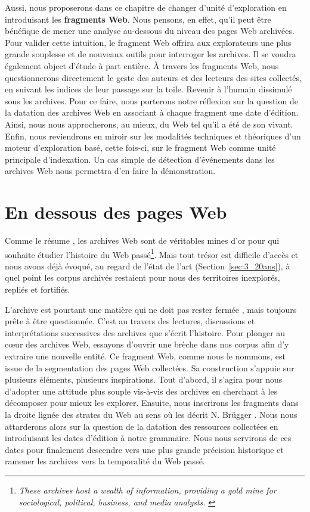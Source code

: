 \documentclass[symmetric,justified,marginals=raggedouter]{tufte-book}
\begin{document}
Aussi, nous proposerons dans ce chapitre de changer d'unité d'exploration en introduisant les \textbf{fragments Web}. Nous pensons, en effet, qu'il peut être bénéfique de mener une analyse au-dessous du niveau des pages Web archivées. Pour valider cette intuition, le fragment Web offrira aux explorateurs une plus grande souplesse et de nouveaux outils pour interroger les archives. Il se voudra également object d'étude à part entière. À travers les fragments Web, nous questionnerons directement le geste des auteurs et des lecteurs des sites collectés, en suivant les indices de leur passage sur la toile. Revenir à l'humain dissimulé sous les archives. Pour ce faire, nous porterons notre réflexion sur la question de la datation des archives Web en associant à chaque fragment une date d'édition. Ainsi, nous nous approcherons, au mieux, du Web tel qu'il a été de son vivant. Enfin, nous reviendrons en miroir sur les modalités techniques et théoriques d'un moteur d'exploration basé, cette fois-ci, sur le fragment Web comme unité principale d'indexation. Un cas simple de détection d'événements dans les archives Web nous permettra d'en faire la démonstration.

\section{En dessous des pages Web}
\label{sec:5_dessous}

\noindent Comme le résume \citep{weikum_longitudinal_2011}, les archives Web sont de véritables mines d'or pour qui souhaite étudier l'histoire du Web passé\footnote{\RaggedOuter \og\textit{These archives host a wealth of information, providing a gold mine for sociological, political, business, and media analysts.}\fg{} \citep{weikum_longitudinal_2011}}. Mais tout trésor est difficile d'accès et nous avons déjà évoqué, au regard de l'état de l'art (Section~\ref{sec:3_20ans}), à quel point les corpus archivés restaient pour nous des territoires inexplorés, repliés et fortifiés. 

L'archive est pourtant une matière qui ne doit pas rester fermée \citep{ketelaar_de_2006}, mais toujours prête à être questionnée. C'est au travers des lectures, discussions et interprétations successives des archives que s'écrit l'histoire. Pour plonger au cœur des archives Web, essayons d'ouvrir une brèche dans nos corpus afin d'y extraire une nouvelle entité. Ce fragment Web, comme nous le nommons, est issue de la segmentation des pages Web collectées. Sa construction s'appuie sur plusieurs éléments, plusieurs inspirations. Tout d'abord, il s'agira pour nous d'adopter une attitude plus souple vis-à-vis des archives en cherchant à les décomposer pour mieux les explorer. Ensuite, nous inscrirons les fragments dans la droite lignée des strates du Web au sens où les décrit N. Brügger \citep{brugger_website_2009}. Nous nous attarderons alors sur la question de la datation des ressources collectées en introduisant les dates d'édition à notre grammaire. Nous nous servirons de ces dates pour finalement descendre vers une plus grande précision historique et ramener les archives vers la temporalité du Web passé.
\end{document}
